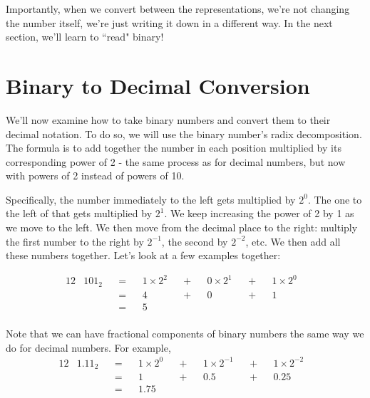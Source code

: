 Importantly, when we convert between the representations, we're not changing the number itself, we're just writing it down in a different way. In the next section, we'll learn to ``read" binary!

%

\section{Binary to Decimal Conversion}
We’ll now examine how to take binary numbers and convert them to their decimal notation. To do so, we will use the binary number's radix decomposition. The formula is to add together the number in each position multiplied by its corresponding power of 2 - the same process as for decimal numbers, but now with powers of 2 instead of powers of 10. 

Specifically, the number immediately to the left gets multiplied by $2^0$. The one to the left of that gets multiplied by $2^1$. We keep increasing the power of 2 by 1 as we move to the left. We then move from the decimal place to the right: multiply the first number to the right by $2^{-1}$, the second by $2^{-2}$, etc. We then add all these numbers together. Let's look at a few examples together:

\begin{alignat*}{12}
& 101_2 &&=&& 1\times2^2 &&+&& 0\times2^1 &&+&& 1\times2^0 & \\
&              &&=&& 4     &&+&& 0 &&+&& 1 & \\
&              &&=&& 5 &&  & \\
\end{alignat*}

Note that we can have fractional components of binary numbers the same way we do for decimal numbers. For example, 
\begin{alignat*}{12}
& 1.11_2 &&=&& 1\times2^0 &&+&& 1\times2^{-1} &&+&& 1\times2^{-2} & \\
&              &&=&& 1 &&+&& 0.5 &&+&& 0.25 & \\
&              &&=&& 1.75 &&  & \\
\end{alignat*}

